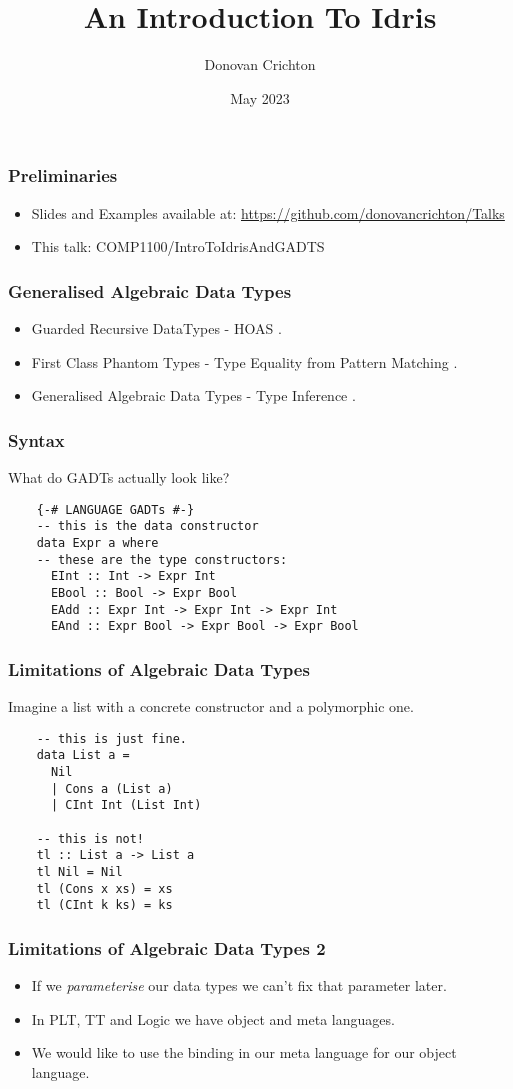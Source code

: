 \documentclass[hyperref={colorlinks = true,linkcolor = blue, citecolor = blue, urlcolor = blue}]{beamer}
\title{An Introduction To Idris}
\author{Donovan Crichton}
\date{May 2023}
\begin{document}
 
\frame{\titlepage}

\begin{frame}[fragile]
  \frametitle{Preliminaries}
  \begin{itemize}
  \item Slides and Examples available at:
    \url{https://github.com/donovancrichton/Talks}
  \item This talk: COMP1100/IntroToIdrisAndGADTS
  \end{itemize}
\end{frame}

\begin{frame}[fragile]
\frametitle{Generalised Algebraic Data Types}
\begin{itemize}
  \item Guarded Recursive DataTypes - HOAS \citep{xi2003guarded}.
  \item First Class Phantom Types - Type Equality from Pattern Matching \citep{cheney2003first}.
  \item Generalised Algebraic Data Types - Type Inference \citep{jones2004wobbly}.
\end{itemize}
\end{frame}

\begin{frame}[fragile]
  \frametitle{Syntax}
  What do GADTs actually look like?
  \begin{verbatim}
    {-# LANGUAGE GADTs #-}
    -- this is the data constructor
    data Expr a where
    -- these are the type constructors:
      EInt :: Int -> Expr Int
      EBool :: Bool -> Expr Bool
      EAdd :: Expr Int -> Expr Int -> Expr Int
      EAnd :: Expr Bool -> Expr Bool -> Expr Bool
  \end{verbatim}
\end{frame}

\begin{frame}[fragile]
  \frametitle{Limitations of Algebraic Data Types}
  Imagine a list with a concrete constructor and a polymorphic one.
  \begin{verbatim}
    -- this is just fine.
    data List a =
      Nil
      | Cons a (List a)
      | CInt Int (List Int)

    -- this is not! 
    tl :: List a -> List a
    tl Nil = Nil
    tl (Cons x xs) = xs
    tl (CInt k ks) = ks
  \end{verbatim}
\end{frame}

\begin{frame}[fragile]
\frametitle{Limitations of Algebraic Data Types 2}
\begin{itemize}
  \item If we \emph{parameterise} our data types we can't fix that parameter later.
  \item In PLT, TT and Logic we have object and meta languages.
  \item We would like to use the binding in our meta language for our object language.
\end{itemize}
\end{frame}
\end{document}
